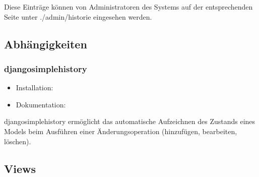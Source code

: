 \documentclass[letterpaper,10pt,english]{sphinxmanual}
\begin{document}
Diese Einträge können von Administratoren des Systems auf der entsprechenden Seite unter ./admin/historie eingesehen werden.


\subsection{Abhängigkeiten}
\label{\detokenize{masterCodeDoc:abhangigkeiten}}

\subsubsection{django\sphinxhyphen{}simple\sphinxhyphen{}history}
\label{\detokenize{masterCodeDoc:django-simple-history}}\begin{itemize}
\item {} 
Installation: 

\item {} 
Dokumentation: 

\end{itemize}

django\sphinxhyphen{}simple\sphinxhyphen{}history ermöglicht das automatische Aufzeichnen des Zustands eines Models beim Ausführen einer Änderungsoperation (hinzufügen, bearbeiten, löschen).


\subsection{Views}
\label{\detokenize{masterCodeDoc:id3}}\label{\detokenize{masterCodeDoc:module-historie.views}}
\end{document}
